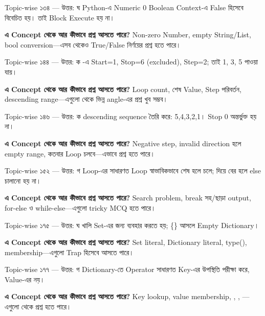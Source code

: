 \begin{explainbox}{Topic-wise ১৩৪ — উত্তর: ঘ}
Python-এ Numeric 0 Boolean Context-এ False হিসেবে বিবেচিত হয়। তাই  Block Execute হয় না।

\textbf{এ Concept থেকে আর কীভাবে প্রশ্ন আসতে পারে?} Non-zero Number, empty String/List, bool conversion—এসব থেকেও True/False নির্ণয়ের প্রশ্ন হতে পারে।
\end{explainbox}

\begin{explainbox}{Topic-wise ১৪৪ — উত্তর: ক}
-এ Start=1, Stop=6 (excluded), Step=2; তাই 1, 3, 5 পাওয়া যায়।

\textbf{এ Concept থেকে আর কীভাবে প্রশ্ন আসতে পারে?} Loop count, শেষ Value, Step পরিবর্তন, descending range—এগুলো থেকে ভিন্ন angle-এর প্রশ্ন খুব সম্ভব।
\end{explainbox}

\begin{explainbox}{Topic-wise ১৪৬ — উত্তর: ক}
 descending sequence তৈরি করে: 5,4,3,2,1। Stop 0 অন্তর্ভুক্ত হয় না।

\textbf{এ Concept থেকে আর কীভাবে প্রশ্ন আসতে পারে?} Negative step, invalid direction হলে empty range, কতবার Loop চলবে—এভাবে প্রশ্ন হতে পারে।
\end{explainbox}

\begin{explainbox}{Topic-wise ১৫২ — উত্তর: গ}
Loop-এর  সাধারণত Loop স্বাভাবিকভাবে শেষ হলে চলে;  দিয়ে বের হলে else চালানো হয় না।

\textbf{এ Concept থেকে আর কীভাবে প্রশ্ন আসতে পারে?} Search problem, break সহ/ছাড়া output, for-else ও while-else—এগুলো tricky MCQ হতে পারে।
\end{explainbox}

\begin{explainbox}{Topic-wise ১৭৫ — উত্তর: ঘ}
খালি Set-এর জন্য  ব্যবহার করতে হয়; \textenglish{\ttfamily \{\}} আসলে Empty Dictionary।

\textbf{এ Concept থেকে আর কীভাবে প্রশ্ন আসতে পারে?} Set literal, Dictionary literal, type(), membership—এগুলো Trap হিসেবে আসতে পারে।
\end{explainbox}

\begin{explainbox}{Topic-wise ১৭৭ — উত্তর: গ}
Dictionary-তে  Operator সাধারণত Key-এর উপস্থিতি পরীক্ষা করে, Value-এর নয়।

\textbf{এ Concept থেকে আর কীভাবে প্রশ্ন আসতে পারে?} Key lookup, value membership, , , —এগুলো থেকে প্রশ্ন হতে পারে।
\end{explainbox}

